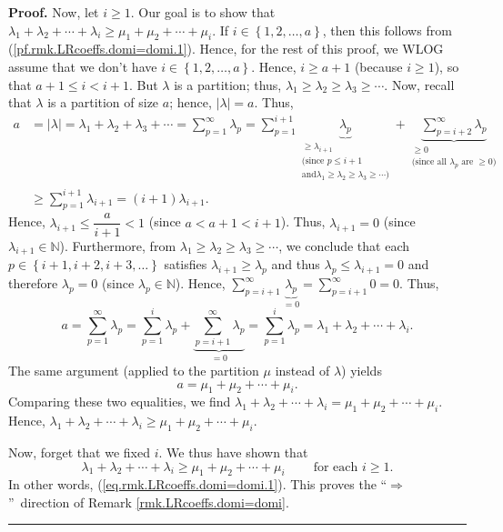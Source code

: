 \documentclass[numbers=enddot,12pt,final,onecolumn,notitlepage]{scrartcl}%
\theoremstyle{definition}
\newenvironment{proof}[1][Proof]{\noindent\textbf{#1.} }{\ \rule{0.5em}{0.5em}}
\let\sumnonlimits\sum
\renewcommand{\sum}{\sumnonlimits\limits}
\begin{document}
\begin{proof}
Now, let $i\geq1$. Our goal is to show that $\lambda_{1}+\lambda_{2}%
+\cdots+\lambda_{i}\geq\mu_{1}+\mu_{2}+\cdots+\mu_{i}$. If $i\in\left\{
1,2,\ldots,a\right\}  $, then this follows from
(\ref{pf.rmk.LRcoeffs.domi=domi.1}). Hence, for the rest of this proof, we
WLOG assume that we don't have $i\in\left\{  1,2,\ldots,a\right\}  $. Hence,
$i\geq a+1$ (because $i\geq1$), so that $a+1\leq i<i+1$. But $\lambda$ is a
partition; thus, $\lambda_{1}\geq\lambda_{2}\geq\lambda_{3}\geq\cdots$. Now,
recall that $\lambda$ is a partition of size $a$; hence, $\left\vert
\lambda\right\vert =a$. Thus,%
\begin{align*}
a  &  =\left\vert \lambda\right\vert =\lambda_{1}+\lambda_{2}+\lambda
_{3}+\cdots=\sum_{p=1}^{\infty}\lambda_{p}=\sum_{p=1}^{i+1}\underbrace{\lambda
_{p}}_{\substack{\geq\lambda_{i+1}\\\text{(since }p\leq i+1\\\text{and
}\lambda_{1}\geq\lambda_{2}\geq\lambda_{3}\geq\cdots\text{)}}%
}+\underbrace{\sum_{p=i+2}^{\infty}\lambda_{p}}_{\substack{\geq0\\\text{(since
all }\lambda_{p}\text{ are }\geq0\text{)}}}\\
&  \geq\sum_{p=1}^{i+1}\lambda_{i+1}=\left(  i+1\right)  \lambda_{i+1}.
\end{align*}
Hence, $\lambda_{i+1}\leq\dfrac{a}{i+1}<1$ (since $a<a+1<i+1$). Thus,
$\lambda_{i+1}=0$ (since $\lambda_{i+1}\in\mathbb{N}$). Furthermore, from
$\lambda_{1}\geq\lambda_{2}\geq\lambda_{3}\geq\cdots$, we conclude that each
$p\in\left\{  i+1,i+2,i+3,\ldots\right\}  $ satisfies $\lambda_{i+1}%
\geq\lambda_{p}$ and thus $\lambda_{p}\leq\lambda_{i+1}=0$ and therefore
$\lambda_{p}=0$ (since $\lambda_{p}\in\mathbb{N}$). Hence, $\sum
_{p=i+1}^{\infty}\underbrace{\lambda_{p}}_{=0}=\sum_{p=i+1}^{\infty}0=0$.
Thus,%
\[
a=\sum_{p=1}^{\infty}\lambda_{p}=\sum_{p=1}^{i}\lambda_{p}+\underbrace{\sum
_{p=i+1}^{\infty}\lambda_{p}}_{=0}=\sum_{p=1}^{i}\lambda_{p}=\lambda
_{1}+\lambda_{2}+\cdots+\lambda_{i}.
\]
The same argument (applied to the partition $\mu$ instead of $\lambda$) yields%
\[
a=\mu_{1}+\mu_{2}+\cdots+\mu_{i}.
\]
Comparing these two equalities, we find $\lambda_{1}+\lambda_{2}%
+\cdots+\lambda_{i}=\mu_{1}+\mu_{2}+\cdots+\mu_{i}$. Hence, $\lambda
_{1}+\lambda_{2}+\cdots+\lambda_{i}\geq\mu_{1}+\mu_{2}+\cdots+\mu_{i}$.

Now, forget that we fixed $i$. We thus have shown that
\[
\lambda_{1}+\lambda_{2}+\cdots+\lambda_{i}\geq\mu_{1}+\mu_{2}+\cdots+\mu
_{i}\ \ \ \ \ \ \ \ \ \ \text{for each }i\geq1.
\]
In other words, (\ref{eq.rmk.LRcoeffs.domi=domi.1}). This proves the
\textquotedblleft$\Longrightarrow$\textquotedblright\ direction of Remark
\ref{rmk.LRcoeffs.domi=domi}.
\end{proof}
\end{document}
